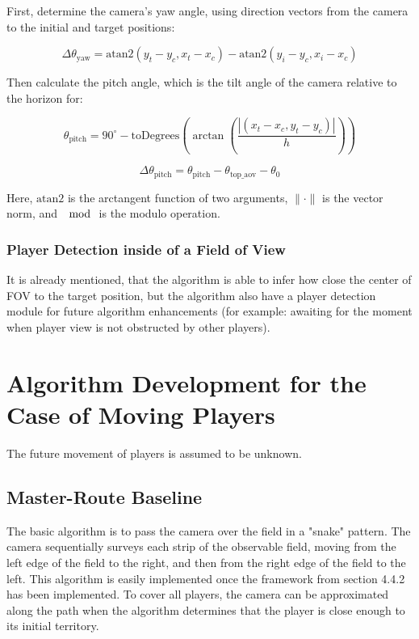    First, determine the camera's yaw angle, using direction vectors from the camera to the initial and target positions:

    $$
   \Delta \theta_{\text{yaw}} = \text{atan2}(y_t - y_c, x_t - x_c) - \text{atan2}(y_i - y_c, x_i - x_c)
    $$

   Then calculate the pitch angle, which is the tilt angle of the camera relative to the horizon for:

    $$
   \theta_{\text{pitch}} = 90^\circ - \text{toDegrees}(\arctan( \frac{|(x_t-x_c, y_t-y_c) | }{h}) )
    $$

    $$
   \Delta \theta_{\text{pitch}} = \theta_{\text{pitch}} - \theta_{\text{top\_aov}} - \theta_{0}
    $$

Here, $ \text{atan2}  $ is the arctangent function of two arguments, $ \| \cdot \|  $ is the vector norm, and $\mod$ is the modulo operation.

\subsubsection{Player Detection inside of a Field of View}
It is already mentioned, that the algorithm is able to infer how close the center of FOV to the target position, but the algorithm also have a player detection module for future algorithm enhancements (for example: awaiting for the moment when player view is not obstructed by other players). 




\section{Algorithm Development for the Case of Moving Players}
The future movement of players is assumed to be unknown.

\subsection{Master-Route Baseline}
The basic algorithm is to pass the camera over the field in a "snake" pattern. The camera sequentially surveys each strip of the observable field, moving from the left edge of the field to the right, and then from the right edge of the field to the left. This algorithm is easily implemented once the framework from section 4.4.2 has been implemented. To cover all players, the camera can be approximated along the path when the algorithm determines that the player is close enough to its initial territory.


